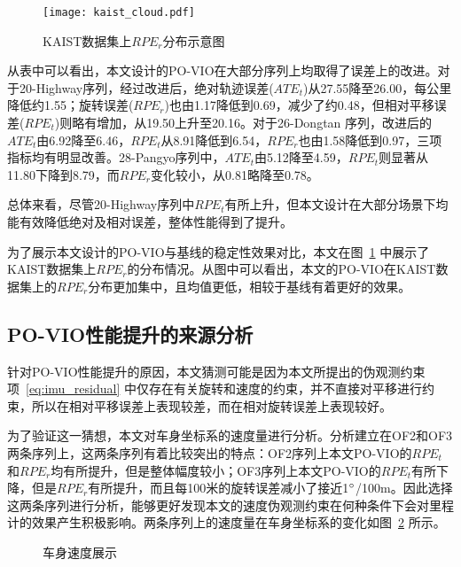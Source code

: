 \begin{figure}
  \centering
  \texttt{[image: kaist\_cloud.pdf]}
  \caption{KAIST数据集上$RPE_r$\textdownarrow{}分布示意图}
  \label{fig:vio_kaist}
\end{figure}

从表中可以看出，本文设计的PO-VIO在大部分序列上均取得了误差上的改进。对于20-Highway序列，经过改进后，绝对轨迹误差($ATE_t$)从27.55降至26.00，每公里降低约1.55；旋转误差($RPE_r$)也由1.17降低到0.69，减少了约0.48，但相对平移误差($RPE_t$)则略有增加，从19.50上升至20.16。对于26-Dongtan 序列，改进后的$ATE_t$由6.92降至6.46，$RPE_t$从8.91降低到6.54，$RPE_r$也由1.58降低到0.97，三项指标均有明显改善。28-Pangyo序列中，$ATE_t$由5.12降至4.59，$RPE_t$则显著从11.80下降到8.79，而$RPE_r$变化较小，从0.81略降至0.78。

总体来看，尽管20-Highway序列中$RPE_t$有所上升，但本文设计在大部分场景下均能有效降低绝对及相对误差，整体性能得到了提升。

为了展示本文设计的PO-VIO与基线的稳定性效果对比，本文在图~\ref{fig:vio_kaist} 中展示了KAIST数据集上$RPE_r$\textdownarrow{}的分布情况。从图中可以看出，本文的PO-VIO在KAIST数据集上的$RPE_r$\textdownarrow{}分布更加集中，且均值更低，相较于基线有着更好的效果。

\subsection{PO-VIO性能提升的来源分析}
针对PO-VIO性能提升的原因，本文猜测可能是因为本文所提出的伪观测约束项~\eqref{eq:imu_residual} 中仅存在有关旋转和速度的约束，并不直接对平移进行约束，所以在相对平移误差上表现较差，而在相对旋转误差上表现较好。

为了验证这一猜想，本文对车身坐标系的速度量进行分析。分析建立在OF2和OF3两条序列上，这两条序列有着比较突出的特点：OF2序列上本文PO-VIO的$RPE_t$和$RPE_r$均有所提升，但是整体幅度较小；OF3序列上本文PO-VIO的$RPE_t$有所下降，但是$RPE_r$有所提升，而且每100米的旋转误差减小了接近1$\degree$/100m。因此选择这两条序列进行分析，能够更好发现本文的速度伪观测约束在何种条件下会对里程计的效果产生积极影响。两条序列上的速度量在车身坐标系的变化如图~\ref{fig:VIO_velocity} 所示。

\begin{figure}
  \centering
  \caption{车身速度展示}
  \label{fig:VIO_velocity}
\end{figure}

